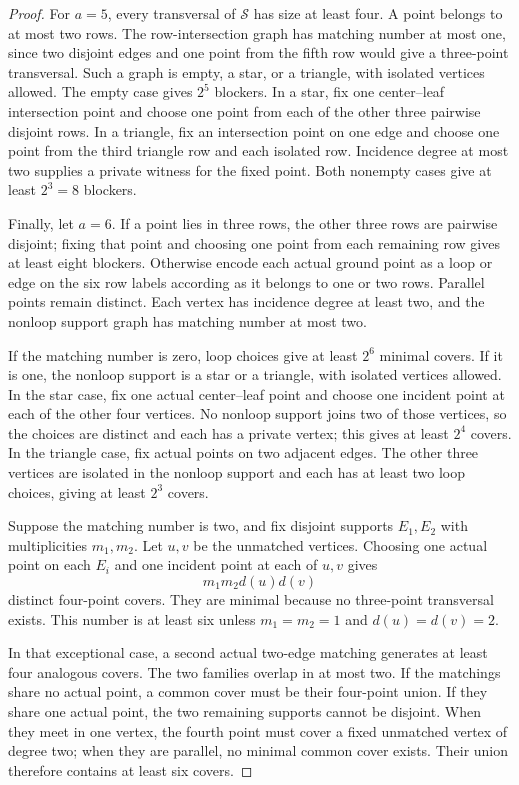 \documentclass[a4paper,fleqn,longmktitle]{cas-sc}
\theoremstyle{definition}
\theoremstyle{remark}
\begin{document}
\begin{proof}
For $a=5$, every transversal of $\mathcal S$ has size at least four.  A point
belongs to at most two rows.  The row-intersection graph has matching number
at most one, since two disjoint edges and one point from the fifth row would
give a three-point transversal.  Such a graph is empty, a star, or a triangle,
with isolated vertices allowed.  The empty case gives $2^5$ blockers.  In a
star, fix one center--leaf intersection point and choose one point from each
of the other three pairwise disjoint rows.  In a triangle, fix an intersection
point on one edge and choose one point from the third triangle row and each
isolated row.  Incidence degree at most two supplies a private witness for the
fixed point.  Both nonempty cases give at least $2^3=8$ blockers.

Finally, let $a=6$.  If a point lies in three rows, the other three rows are
pairwise disjoint; fixing that point and choosing one point from each remaining
row gives at least eight blockers.  Otherwise encode each actual ground point
as a loop or edge on the six row labels according as it belongs to one or two
rows.  Parallel points remain distinct.  Each vertex has incidence degree at
least two, and the nonloop support graph has matching number at most two.

If the matching number is zero, loop choices give at least $2^6$ minimal
covers.  If it is one, the nonloop support is a star or a triangle, with
isolated vertices allowed.  In the star case, fix one actual center--leaf
point and choose one incident point at each of the other four vertices.  No
nonloop support joins two of those vertices, so the choices are distinct and
each has a private vertex; this gives at least $2^4$ covers.  In the triangle
case, fix actual points on two adjacent edges.  The other three vertices are
isolated in the nonloop support and each has at least two loop choices, giving
at least $2^3$ covers.

Suppose the matching number is two, and fix disjoint supports $E_1,E_2$ with
multiplicities $m_1,m_2$.  Let $u,v$ be the unmatched vertices.  Choosing one
actual point on each $E_i$ and one incident point at each of $u,v$ gives
\[
  m_1m_2d(u)d(v)
\]
distinct four-point covers.  They are minimal because no three-point
transversal exists.  This number is at least six unless
$m_1=m_2=1$ and $d(u)=d(v)=2$.

In that exceptional case, a second actual two-edge matching generates at
least four analogous covers.  The two families overlap in at most two.  If
the matchings share no actual point, a common cover must be their four-point
union.  If they share one actual point, the two remaining supports cannot be
disjoint.  When they meet in one vertex, the fourth point must cover a fixed
unmatched vertex of degree two; when they are parallel, no minimal common
cover exists.  Their union therefore contains at least six covers.


\end{proof}
\end{document}
